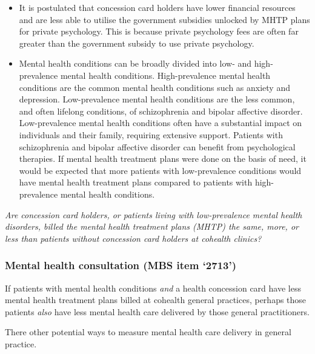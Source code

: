 \documentclass[
  letterpaper,
  DIV=11,
  numbers=noendperiod,
  oneside]{scrartcl}
\begin{document}
\begin{itemize}
\item
  It is postulated that concession card holders have lower financial
  resources and are less able to utilise the government subsidies
  unlocked by MHTP plans for private psychology. This is because private
  psychology fees are often far greater than the government subsidy to
  use private psychology.
\item
  Mental health conditions can be broadly divided into low- and high-
  prevalence mental health conditions. High-prevalence mental health
  conditions are the common mental health conditions such as anxiety and
  depression. Low-prevalence mental health conditions are the less
  common, and often lifelong conditions, of schizophrenia and bipolar
  affective disorder. Low-prevalence mental health conditions often have
  a substantial impact on individuals and their family, requiring
  extensive support. Patients with schizophrenia and
  bipolar affective disorder can benefit from psychological therapies.
  If mental health treatment plans were done on the basis of need, it
  would be expected that more patients with low-prevalence conditions
  would have mental health treatment plans compared to patients with
  high-prevalence mental health conditions.
\end{itemize}

\emph{Are concession card holders, or patients living with
low-prevalence mental health disorders, billed the mental health
treatment plans (MHTP) the same, more, or less than patients without
concession card holders at cohealth clinics?}

\subsubsection{Mental health consultation (MBS item
`2713')}\label{mental-health-consultation-mbs-item-2713}

If patients with mental health conditions \emph{and} a health concession
card have less mental health treatment plans billed at cohealth general
practices, perhaps those patients \emph{also} have less mental health
care delivered by those general practitioners.

There other potential ways to measure mental health care delivery in
general practice.
\end{document}
